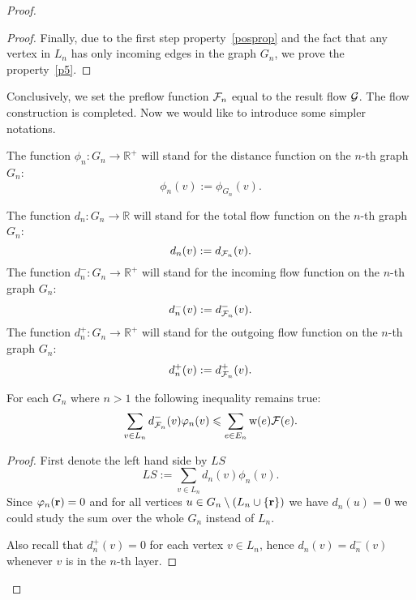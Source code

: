 \documentclass[12pt]{article}
\begin{document}
\begin{proof}
\begin{proof}
        Finally, due to the first step property~\ref{posprop} and the fact that
        any vertex in $L_n$ has only incoming edges in the graph $G_n$, we prove the property~\ref{p5}.
      \end{proof}
      Conclusively, we set the preflow function $\flowposn{n}$ equal to the result flow $\cal{G}$.
      The flow construction is completed.
      Now we would like to introduce some simpler notations.
      \begin{definition}
        The function $\phi_n: G_n \to \mathbb{R}^{+}$ will stand for the distance function on the $n$-th graph $G_n$:
        \[
          \phi_n(v) := \phi_{G_n}(v).
        \]
      \end{definition}
      \begin{definition}
        The function $d_n: G_n \to \mathbb{R}$ will stand for the total flow function on the $n$-th graph $G_n$:
        \[
          d_n(v) := d_{\flowposn{n}}(v).
        \]
        The function $d^{-}_n: G_n \to \mathbb{R}^{+}$ will stand for the incoming flow function on the $n$-th graph $G_n$:
        \[
          d^{-}_n(v) := d^{-}_{\flowposn{n}}(v).
        \]
        The function $d^{+}_n: G_n \to \mathbb{R}^{+}$ will stand for the outgoing flow function on the $n$-th graph $G_n$:
        \[
          d^{+}_n(v) := d^{+}_{\flowposn{n}}(v).
        \]
      \end{definition}
      \begin{lemma}
        For each $G_n$ where $n > 1$ the following inequality remains true:
        \begin{equation}
          \label{main-ineq}
          \sum_{v\in L_n}d_{\flowposn{n}}^{-}(v) \phi_n(v) \leq \sum_{e \in E_n} \wtp(e) \flowpos(e).
        \end{equation}
      \end{lemma}
      \begin{proof}
        First denote the left hand side by $LS$
        \[
          LS := \sum\limits_{v \in L_n} d_n(v) \phi_n(v).
        \]
        Since $\phi_n(\root) = 0$ and for all vertices $u \in G_{n} \setminus \left(L_n \cup \{\root\}\right)$
          we have $d_n(u) = 0$ we could study the sum over the whole $G_n$ instead of $L_n$.

        Also recall that $d_n^{+}(v) = 0$ for each vertex $v \in L_n$, hence $d_n(v) = d_n^{-}(v)$ whenever $v$ is in the $n$-th layer.
          

\end{proof}
\end{proof}
\end{document}
